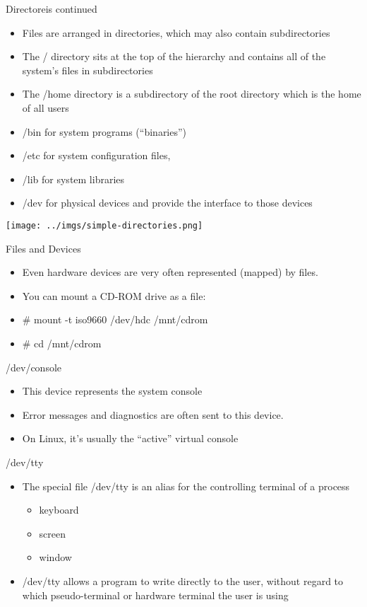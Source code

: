 \documentclass{beamer}
\begin{document}
\begin{frame}{Directoreis continued}
\begin{itemize}
\item Files are arranged in directories, which may also contain subdirectories
\item The / directory sits at the top of the hierarchy and contains all of the system's files in subdirectories
\item The /home directory is a subdirectory of the root directory which is the home of all users
\item /bin for system programs (``binaries'')
\item /etc for system configuration files,
\item /lib for system libraries
\item /dev for physical devices and provide the interface to those devices
\end{itemize}
\end{frame}

\begin{frame}{}
\texttt{[image: ../imgs/simple-directories.png]}
\end{frame}

\begin{frame}{Files and Devices}
\begin{itemize}
\item Even hardware devices are very often represented (mapped) by files.
\item You can mount a CD-ROM drive as a file:
\item \# mount -t iso9660 /dev/hdc /mnt/cdrom
\item \# cd /mnt/cdrom
\end{itemize}
\end{frame}

\begin{frame}{/dev/console}
\begin{itemize}
\item This device represents the system console
\item Error messages and diagnostics are often sent to this device.
\item On Linux, it's usually the ``active'' virtual console
\end{itemize}
\end{frame}

\begin{frame}{/dev/tty}
\begin{itemize}
\item The special file /dev/tty is an alias for the controlling terminal of a process
\begin{itemize}
\item keyboard
\item screen
\item window
\end{itemize}
\item /dev/tty allows a program to write directly to the user, without regard to which pseudo-terminal or hardware terminal the user is using
\end{itemize}
\end{frame}
\end{document}
